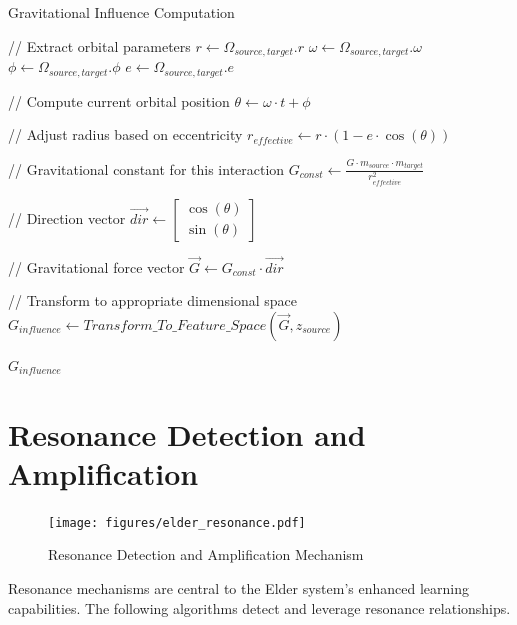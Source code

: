 \begin{algorithm}
\caption{Gravitational Influence Computation}
\begin{algorithmic}[1]
    \State // Extract orbital parameters
    \State $r \gets \Omega_{source,target}.r$ 
    \State $\omega \gets \Omega_{source,target}.\omega$ 
    \State $\phi \gets \Omega_{source,target}.\phi$ 
    \State $e \gets \Omega_{source,target}.e$ 
    
    \State // Compute current orbital position
    \State $\theta \gets \omega \cdot t + \phi$ 
    
    \State // Adjust radius based on eccentricity
    \State $r_{effective} \gets r \cdot (1 - e \cdot \cos(\theta))$
    
    \State // Gravitational constant for this interaction
    \State $G_{const} \gets \frac{G \cdot m_{source} \cdot m_{target}}{r_{effective}^2}$
    
    \State // Direction vector
    \State $\vec{dir} \gets \begin{bmatrix} \cos(\theta) \\ \sin(\theta) \end{bmatrix}$
    
    \State // Gravitational force vector
    \State $\vec{G} \gets G_{const} \cdot \vec{dir}$
    
    \State // Transform to appropriate dimensional space
    \State $G_{influence} \gets Transform\_To\_Feature\_Space(\vec{G}, z_{source})$
    
    \State \Return $G_{influence}$
\EndFunction
\end{algorithmic}
\end{algorithm}

\section{Resonance Detection and Amplification}

\begin{figure}[htbp]
\centering
\texttt{[image: figures/elder\_resonance.pdf]}
\caption{Resonance Detection and Amplification Mechanism}
\label{fig:resonance_detection}
\end{figure}

Resonance mechanisms are central to the Elder system's enhanced learning capabilities. The following algorithms detect and leverage resonance relationships.

